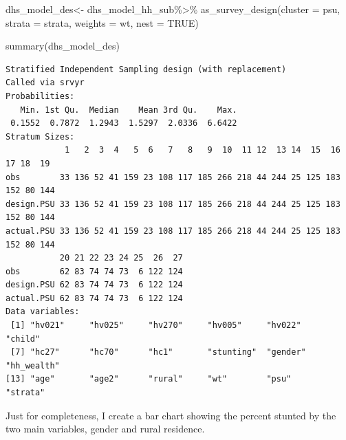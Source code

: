 \documentclass[
  letterpaper,
  DIV=11,
  numbers=noendperiod]{scrreprt}
\newenvironment{Shaded}{\begin{snugshade}}{\end{snugshade}}
\newcommand{\AttributeTok}[1]{\textcolor[rgb]{0.40,0.45,0.13}{#1}}
\newcommand{\ConstantTok}[1]{\textcolor[rgb]{0.56,0.35,0.01}{#1}}
\newcommand{\FunctionTok}[1]{\textcolor[rgb]{0.28,0.35,0.67}{#1}}
\newcommand{\NormalTok}[1]{\textcolor[rgb]{0.00,0.23,0.31}{#1}}
\newcommand{\OtherTok}[1]{\textcolor[rgb]{0.00,0.23,0.31}{#1}}
\newcommand{\SpecialCharTok}[1]{\textcolor[rgb]{0.37,0.37,0.37}{#1}}
\begin{document}
\begin{Shaded}
\begin{Highlighting}[]
\NormalTok{dhs\_model\_des}\OtherTok{\textless{}{-}}\NormalTok{ dhs\_model\_hh\_sub}\SpecialCharTok{\%\textgreater{}\%}
  \FunctionTok{as\_survey\_design}\NormalTok{(}\AttributeTok{cluster =}\NormalTok{ psu,}
                   \AttributeTok{strata =}\NormalTok{ strata,}
                   \AttributeTok{weights =}\NormalTok{ wt,}
                   \AttributeTok{nest =} \ConstantTok{TRUE}\NormalTok{)}

\FunctionTok{summary}\NormalTok{(dhs\_model\_des)}
\end{Highlighting}
\end{Shaded}

\begin{verbatim}
Stratified Independent Sampling design (with replacement)
Called via srvyr
Probabilities:
   Min. 1st Qu.  Median    Mean 3rd Qu.    Max. 
 0.1552  0.7872  1.2943  1.5297  2.0336  6.6422 
Stratum Sizes: 
            1   2  3  4   5  6   7   8   9  10  11 12  13 14  15  16  17 18  19
obs        33 136 52 41 159 23 108 117 185 266 218 44 244 25 125 183 152 80 144
design.PSU 33 136 52 41 159 23 108 117 185 266 218 44 244 25 125 183 152 80 144
actual.PSU 33 136 52 41 159 23 108 117 185 266 218 44 244 25 125 183 152 80 144
           20 21 22 23 24 25  26  27
obs        62 83 74 74 73  6 122 124
design.PSU 62 83 74 74 73  6 122 124
actual.PSU 62 83 74 74 73  6 122 124
Data variables:
 [1] "hv021"     "hv025"     "hv270"     "hv005"     "hv022"     "child"    
 [7] "hc27"      "hc70"      "hc1"       "stunting"  "gender"    "hh_wealth"
[13] "age"       "age2"      "rural"     "wt"        "psu"       "strata"   
\end{verbatim}

Just for completeness, I create a bar chart showing the percent stunted
by the two main variables, gender and rural residence.
\end{document}
